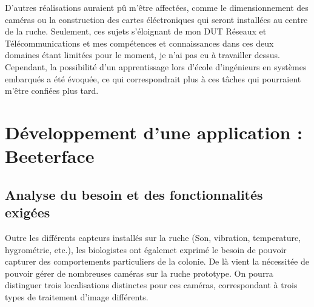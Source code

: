 \documentclass[11pt,french,a4paper]{report}
\begin{document}
D'autres réalisations auraient pû m'être affectées, comme le dimensionnement des caméras ou la construction des cartes éléctroniques
qui seront installées au centre de la ruche. Seulement, ces sujets s'éloignant de mon DUT Réseaux et Télécommunications et mes 
compétences et connaissances dans ces deux domaines étant limitées pour le moment, je n'ai pas eu à travailler dessus.\\

Cependant, la possibilité d'un apprentissage lors d'école d'ingénieurs en systèmes embarqués a été évoquée, ce qui correspondrait 
plus à ces tâches qui pourraient m'être confiées plus tard.\\



\chapter{Développement d'une application : Beeterface}

    \section{Analyse du besoin et des fonctionnalités exigées}

Outre les différents capteurs installés sur la ruche (Son, vibration, temperature, hygrométrie, etc.), 
les biologistes ont égalemet exprimé le besoin de pouvoir capturer des comportements particuliers de la colonie. 
De là vient la nécessitée de pouvoir gérer de nombreuses caméras sur la ruche prototype. 
On pourra distinguer trois localisations distinctes pour ces caméras, correspondant à trois types de traitement d'image différents. \\
\end{document}
